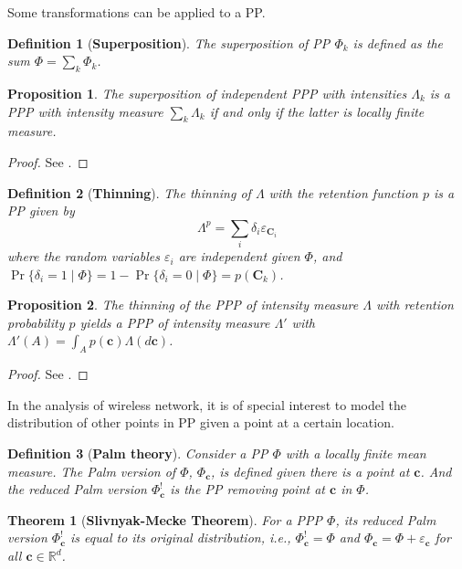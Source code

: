 \documentclass[a4paper,twocolumn]{IEEEtran}
\newtheorem{definition}{\textbf{Definition}}
\newtheorem{proposition}{\textbf{Proposition}}
\newtheorem{theorem}{\textbf{Theorem}}
\begin{document}
Some transformations can be applied to a PP.
\begin{definition}[\textbf{Superposition}]
The superposition of PP $\Phi_k$ is defined as the sum $\Phi=\sum_k \Phi_k$. 	
\end{definition}
\begin{proposition}
The superposition of independent PPP with intensities $\Lambda_k$ is a PPP with intensity measure $\sum_k \Lambda_k$ if and only if the latter is locally finite measure.
\end{proposition}	
\begin{proof}
See \cite[Proposition 1.3.3]{Baccelli2009Vol1}.
\end{proof}
\begin{definition}[\textbf{Thinning}]
The thinning of $\Lambda$ with the retention function $p$ is a PP given by
\begin{displaymath}
\Lambda^p = \sum_i \delta_i \varepsilon_{\bm{C}_i} 
\end{displaymath}
where the random variables $\varepsilon_i$ are independent given $\Phi$, and $\Pr\{\delta_i=1\mid \Phi\}=1-\Pr\{\delta_i=0\mid \Phi\}=p(\bm{C}_k)$.
\end{definition}
\begin{proposition}\label{prop:PPPthinning}
The thinning of the PPP of intensity measure $\Lambda$ with retention probability $p$ yields a PPP of intensity measure $\Lambda'$ with $\Lambda'(A)=\int_A p(\bm{c}) \Lambda(d\bm{c})$.
\end{proposition}
\begin{proof}
See \cite[Proposition 1.3.5]{Baccelli2009Vol1}.
\end{proof}
In the analysis of wireless network, it is of special interest to model the distribution of other points in PP given a point at a certain location.
\begin{definition}[\textbf{Palm theory}]
Consider a PP $\Phi$ with a locally finite mean measure. The Palm version of $\Phi$, $\Phi_{\bm{c}}$, is defined given there is a point at $\bm{c}$. And the reduced Palm version $\Phi_{\bm{c}}^!$ is the PP removing point at $\bm{c}$ in $\Phi$.  
\end{definition}
\begin{theorem}[\textbf{Slivnyak-Mecke Theorem}]
For a PPP $\Phi$, its reduced Palm version $\Phi_{\bm{c}}^!$ is equal to its original distribution, i.e., $\Phi_{\bm{c}}^! = \Phi$ and $\Phi_{\bm{c}} = \Phi+\varepsilon_{\bm{c}}$ for all $\bm{c}\in\mathbb{R}^d$.    
\end{theorem}
\end{document}
